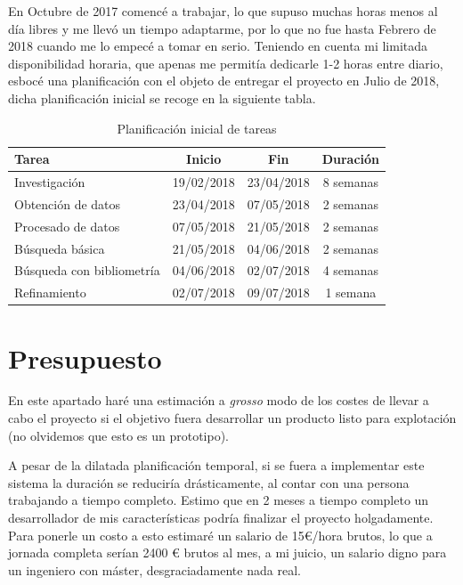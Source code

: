 En Octubre de 2017 comencé a trabajar, lo que supuso muchas horas menos al día libres y me llevó un tiempo adaptarme, por lo que no fue hasta Febrero de 2018 cuando me lo empecé a tomar en serio. Teniendo en cuenta mi limitada disponibilidad horaria, que apenas me permitía dedicarle 1-2 horas entre diario, esbocé una planificación con el objeto de entregar el proyecto en Julio de 2018, dicha planificación inicial se recoge en la siguiente tabla.

\begin{table} [h!]
	\centering
	\begin{tabular}{l c c c}
		\hline
		\textbf{Tarea}            & \textbf{Inicio} & \textbf{Fin} & \textbf{Duración} \\ \hline\hline
		Investigación             & 19/02/2018      & 23/04/2018   & 8 semanas         \\ \hline
		Obtención de datos        & 23/04/2018      & 07/05/2018   & 2 semanas         \\ \hline
		Procesado de datos        & 07/05/2018      & 21/05/2018   & 2 semanas         \\ \hline
		Búsqueda básica           & 21/05/2018      & 04/06/2018   & 2 semanas         \\ \hline
		Búsqueda con bibliometría & 04/06/2018      & 02/07/2018   & 4 semanas         \\ \hline
		Refinamiento              & 02/07/2018      & 09/07/2018   & 1 semana          \\ \hline
	\end{tabular}
	\caption{Planificación inicial de tareas}
\end{table}

\section{Presupuesto}

En este apartado haré una estimación a \textit{grosso} modo de los costes de llevar a cabo el proyecto si el objetivo fuera desarrollar un producto listo para explotación (no olvidemos que esto es un prototipo). 

A pesar de la dilatada planificación temporal, si se fuera a implementar este sistema la duración se reduciría drásticamente, al contar con una persona trabajando a tiempo completo. Estimo que en 2 meses a tiempo completo un desarrollador de mis características podría finalizar el proyecto holgadamente. Para ponerle un costo a esto estimaré un salario de 15€/hora brutos, lo que a jornada completa serían 2400 € brutos al mes, a mi juicio, un salario digno para un ingeniero con máster, desgraciadamente nada real. 

